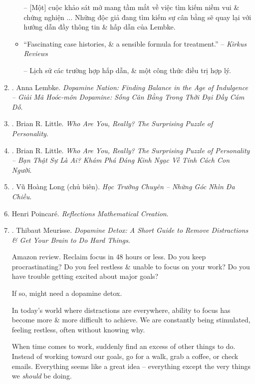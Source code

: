 \documentclass{article}
\begin{document}
\begin{enumerate}
\begin{itemize}
		-- [Một] cuộc khảo sát mở mang tầm mắt về việc tìm kiếm niềm vui \& chứng nghiện $\ldots$ Những độc giả đang tìm kiếm sự cân bằng sẽ quay lại với hướng dẫn đầy thông tin \& hấp dẫn của Lembke.
		\item ``Fascinating case histories, \& a sensible formula for treatment.'' -- {\it Kirkus Reviews}
		
		-- Lịch sử các trường hợp hấp dẫn, \& một công thức điều trị hợp lý.
	\end{itemize}
	
	\item \cite{Lembke_dopamine_VN}. {\sc Anna Lembke}. {\it Dopamine Nation: Finding Balance in the Age of Indulgence -- Giải Mã Hoóc-môn Dopamine: Sống Cân Bằng Trong Thời Đại Đầy Cám Dỗ}.\hfill{\sf[done]}
	
	\item \cite{Little_personality}. {\sc Brian R. Little}. {\it Who Are You, Really? The Surprising Puzzle of Personality}.\hfill{\sf[done]}
	
	\item \cite{Little_personality_VN}. {\sc Brian R. Little}. {\it Who Are You, Really? The Surprising Puzzle of Personality -- Bạn Thật Sự Là Ai? Khám Phá Đáng Kinh Ngạc Về Tính Cách Con Người}.\hfill{\sf[done]}
	
	\item \cite{Long2021}. Vũ Hoàng Long (chủ biên). {\it Học Trường Chuyên -- Những Góc Nhìn Đa Chiều}.\hfill{\sf[done]}
	
	\item {\sc Henri Poincar\'e}. {\it Reflections Mathematical Creation}.\hfill{\sf[done]}
	
	\item \cite{Meurisse_dopamine}. {\sc Thibaut Meurisse}. {\it Dopamine Detox: A Short Guide to Remove Distractions \& Get Your Brain to Do Hard Things}. {}
	
	{\sf Amazon review.} Reclaim focus in 48 hours or less. Do you keep procrastinating? Do you feel restless \& unable to focus on your work? Do you have trouble getting excited about major goals?
	
	If so, might need a dopamine detox.
	
	In today's world where distractions are everywhere, ability to focus has become more \& more difficult to achieve. We are constantly being stimulated, feeling restless, often without knowing why.
	
	When time comes to work, suddenly find an excess of other things to do. Instead of working toward our goals, go for a walk, grab a coffee, or check emails. Everything seems like a great idea -- everything except the very things we {\it should} be doing.
	

\end{enumerate}
\end{document}
